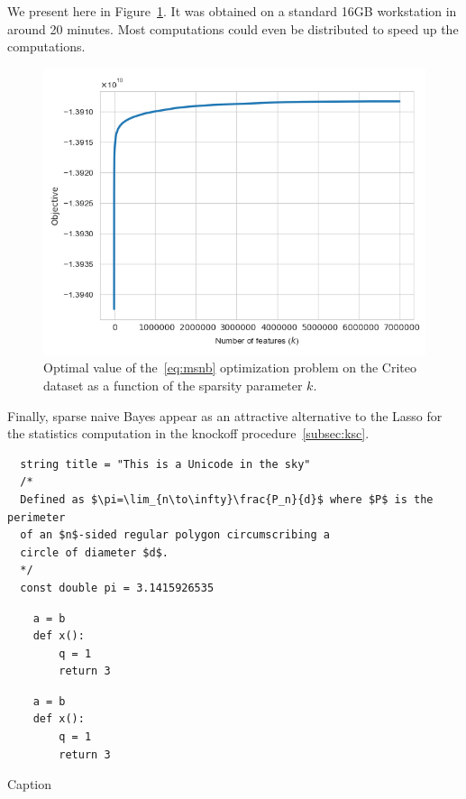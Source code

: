 We present here in Figure~\ref{fig:criteo_hash_elbow}.
It was obtained on a standard 16GB workstation in around 20 minutes.
Most computations could even be distributed to speed up the computations.
\begin{figure}
    \centering
    \includegraphics[width=0.75\linewidth, height=0.4\linewidth]{figures/criteo_hash_elbow.png}
    \caption{
        Optimal value of the~\ref{eq:msnb} optimization problem on the Criteo dataset
        as a function of the sparsity parameter $k$.
    }
    \label{fig:criteo_hash_elbow}
\end{figure}

\bigbreak
Finally, sparse naive Bayes appear as an attractive alternative to the Lasso for the statistics computation
in the knockoff procedure~\ref{subsec:ksc}.

\begin{verbatim}
  string title = "This is a Unicode in the sky"
  /*
  Defined as $\pi=\lim_{n\to\infty}\frac{P_n}{d}$ where $P$ is the perimeter
  of an $n$-sided regular polygon circumscribing a
  circle of diameter $d$.
  */
  const double pi = 3.1415926535
\end{verbatim}

\begin{verbatim}
    a = b
    def x():
        q = 1
        return 3
\end{verbatim}

\begin{listing}
\begin{verbatim}
    a = b
    def x():
        q = 1
        return 3
\end{verbatim}
\caption{Caption}\label{list}
\end{listing}